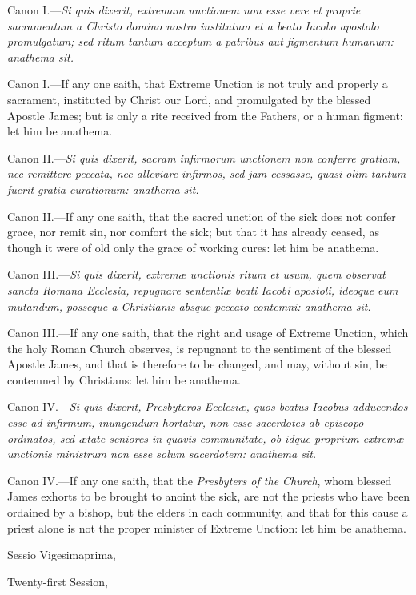 Canon I.—\emph{Si quis dixerit, extremam unctionem non esse vere et proprie sacramentum a Christo domino nostro institutum et a beato Iacobo apostolo promulgatum; sed ritum tantum acceptum a patribus aut figmentum humanum: anathema sit.}

Canon I.—If any one saith, that Extreme Unction is not truly and properly a sacrament, instituted by Christ our Lord, and promulgated by the blessed Apostle James; but is only a rite received from the Fathers, or a human figment: let him be anathema.

Canon II.—\emph{Si quis dixerit, sacram infirmorum unctionem non conferre gratiam, nec remittere peccata, nec alleviare infirmos, sed jam cessasse, quasi olim tantum fuerit gratia curationum: anathema sit.}

Canon II.—If any one saith, that the sacred unction of the sick does not confer grace, nor remit sin, nor comfort the sick; but that it has already ceased, as though it were of old only the grace of working cures: let him be anathema.

Canon III.—\emph{Si quis dixerit, extremæ unctionis ritum et usum, quem observat sancta Romana Ecclesia, repugnare sententiæ beati Iacobi apostoli, ideoque eum mutandum, posseque a Christianis absque peccato contemni: anathema sit.}

Canon III.—If any one saith, that the right and usage of Extreme Unction, which the holy Roman Church observes, is repugnant to the sentiment of the blessed Apostle James, and that is therefore to be changed, and may, without sin, be contemned by Christians: let him be anathema.

Canon IV.—\emph{Si quis dixerit, Presbyteros Ecclesiæ, quos beatus Iacobus adducendos esse ad infirmum, inungendum hortatur, non esse sacerdotes ab episcopo ordinatos, sed ætate seniores in quavis communitate, ob idque proprium extremæ unctionis ministrum non esse solum sacerdotem: anathema sit.}

Canon IV.—If any one saith, that the \emph{Presbyters of the Church}, whom blessed James exhorts to be brought to anoint the sick, are not the priests who have been ordained by a bishop, but the elders in each community, and that for this cause a priest alone is not the proper minister of Extreme Unction: let him be anathema.


Sessio Vigesimaprima,

Twenty-first Session,

